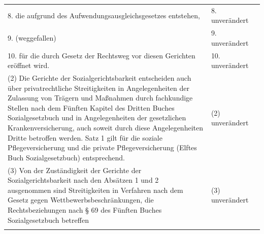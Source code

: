 \documentclass[10pt,a4paper,landscape]{article}
\begin{document}
\begin{longtable}{|L{8.2cm}|L{8.2cm}|L{8.2cm}|}
\hhline{|---|}
8.  \newline die aufgrund des  \newline Aufwendungsausgleichsgesetzes  \newline entstehen, & 8. unverändert &  \\
\hhline{|---|}
9.  \newline (weggefallen) & 9. unverändert &  \\
\hhline{|---|}
10.  \newline für die durch Gesetz der Rechtsweg vor  \newline diesen Gerichten eröffnet wird. & 10. unverändert &  \\
\hhline{|---|}
(2) Die Gerichte der Sozialgerichtsbarkeit  \newline entscheiden auch über privatrechtliche  \newline Streitigkeiten in Angelegenheiten der  \newline Zulassung von Trägern und Maßnahmen  \newline durch fachkundige Stellen nach dem  \newline Fünften Kapitel des Dritten Buches  \newline Sozialgesetzbuch und in Angelegenheiten  \newline der gesetzlichen Krankenversicherung,  \newline auch soweit durch diese Angelegenheiten  \newline Dritte betroffen werden. Satz 1 gilt für die  \newline soziale Pflegeversicherung und die private  \newline Pflegeversicherung (Elftes Buch  \newline Sozialgesetzbuch) entsprechend. & (2) unverändert &  \\
\hhline{|---|}
(3) Von der Zuständigkeit der Gerichte der  \newline Sozialgerichtsbarkeit nach den Absätzen 1  \newline und 2 ausgenommen sind Streitigkeiten in  \newline Verfahren nach dem Gesetz gegen  \newline Wettbewerbsbeschränkungen, die  \newline Rechtsbeziehungen nach \S{} 69 des Fünften  \newline Buches Sozialgesetzbuch betreffen & (3) unverändert &  \\
\hhline{|---|}
\end{longtable}
\newpage
\end{document}
